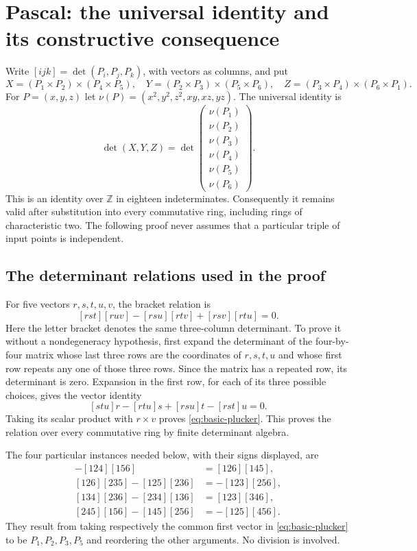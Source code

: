 \section{Pascal: the universal identity and its constructive consequence}\label{sec:pascal}
Write $[ijk]=\det(P_i,P_j,P_k)$, with vectors as columns, and put
\[
 X=(P_1\times P_2)\times(P_4\times P_5),\quad
 Y=(P_2\times P_3)\times(P_5\times P_6),\quad
 Z=(P_3\times P_4)\times(P_6\times P_1).
\]
For $P=(x,y,z)$ let
$\nu(P)=(x^2,y^2,z^2,xy,xz,yz)$.  The universal identity is
\begin{equation}\label{eq:pascal-universal}
 \det(X,Y,Z)=\det\begin{pmatrix}
 \nu(P_1)\\\nu(P_2)\\\nu(P_3)\\
 \nu(P_4)\\\nu(P_5)\\\nu(P_6)
 \end{pmatrix}.
\end{equation}
This is an identity over $\mathbb Z$ in eighteen indeterminates.  Consequently
it remains valid after substitution into every commutative ring, including
rings of characteristic two.  The following proof never assumes that a
particular triple of input points is independent.

\subsection{The determinant relations used in the proof}
For five vectors $r,s,t,u,v$, the bracket relation is
\begin{equation}\label{eq:basic-plucker}
 [rst][ruv]-[rsu][rtv]+[rsv][rtu]=0.
\end{equation}
Here the letter bracket denotes the same three-column determinant.
To prove it without a nondegeneracy hypothesis, first expand the determinant
of the four-by-four matrix whose last three rows are the coordinates of
$r,s,t,u$ and whose first row repeats any one of those three rows.  Since
the matrix has a repeated row, its determinant is zero.  Expansion in the
first row, for each of its three possible choices, gives the vector identity
\[
 [stu]r-[rtu]s+[rsu]t-[rst]u=0.
\]
Taking its scalar product with $r\times v$ proves
\eqref{eq:basic-plucker}.  This proves the relation over every commutative
ring by finite determinant algebra.

The four particular instances needed below, with their signs displayed, are
\begin{align}
 [125][146]-[124][156]&=[126][145],\\
 [126][235]-[125][236]&=-[123][256],\\
 [134][236]-[234][136]&=[123][346],\\
 [245][156]-[145][256]&=-[125][456].
\end{align}
They result from taking respectively the common first vector in
\eqref{eq:basic-plucker} to be $P_1,P_2,P_3,P_5$ and reordering the other
arguments.  No division is involved.


